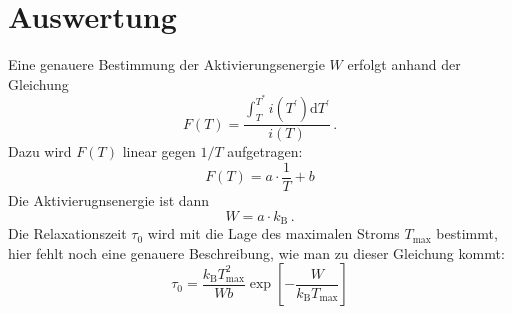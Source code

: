 \section{Auswertung}

Eine genauere Bestimmung der Aktivierungsenergie $W$ erfolgt anhand der Gleichung
\begin{equation*}
    F(T) = \frac{\int_T^{T^\ast} i(T^\prime)\mathrm{d}T^\prime}{i(T)}\,.
\end{equation*}
Dazu wird $F(T)$ linear gegen $1/T$ aufgetragen:
\begin{equation*}
    F(T) = a \cdot\frac{1}{T} + b
\end{equation*}
Die Aktivierugnsenergie ist dann
\begin{equation*}
    W = a \cdot k_\text{B}\,.
\end{equation*}
Die Relaxationszeit $\tau_0$ wird mit die Lage des maximalen Stroms $T_\text{max}$ bestimmt, hier fehlt noch eine genauere Beschreibung, wie man zu dieser Gleichung kommt:
\begin{equation}
    \label{eqn:tau0}
    \tau_0 = \frac{k_\text{B}T_\text{max}^2}{Wb}
             \exp\!\left[-\frac{W}{k_\text{B}T_\text{max}} \right]
\end{equation}
